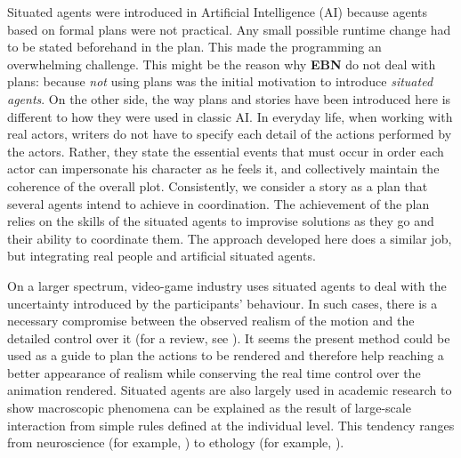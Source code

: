 \documentclass[
		twoside,openright,titlepage,numbers=noenddot,manychapters,
		headinclude,%
                footinclude=false,cleardoublepage=empty,
                BCOR=5mm,
		fontsize=11pt, %
                 enabledeprecatedfontcommands]{scrreprt}
\begin{document}
Situated agents were introduced in Artificial Intelligence (AI) because agents based on formal plans were not practical. Any small possible runtime change had to be stated beforehand in the plan. This made the programming an overwhelming challenge. This might be the reason why \textbf{EBN} do not deal with plans: because \emph{not} using plans was the initial motivation to introduce \emph{situated agents}. On the other side, the way plans and stories have been introduced here is different to how they were used in classic AI. In everyday life, when working with real actors, writers do not have to specify each detail of the actions performed by the actors. Rather, they state the essential events that must occur in order each actor can impersonate his character as he feels it, and collectively maintain the coherence of the overall plot. Consistently, we consider a story as a plan that several agents intend to achieve in coordination. The achievement of the plan relies on the skills of the situated agents to improvise solutions as they go and their ability to coordinate them. The approach developed here does a similar job, but integrating real people and artificial situated agents.

On a larger spectrum, video-game industry uses situated agents to deal with the uncertainty introduced by the participants' behaviour. In such cases, there is a necessary compromise between the observed realism of the motion and the detailed control over it (for a review, see \cite{Welbergen2009}). It seems the present method could be used as a guide to plan the actions to be rendered and therefore help reaching a better appearance of realism while conserving the real time control over the animation rendered.
Situated agents are also largely used in academic research to show macroscopic phenomena can be explained as the result of large-scale interaction from simple rules defined at the individual level. This tendency ranges from neuroscience (for example, \cite{purves2006evolution}) to ethology (for example, \cite{beltran2006sbg}).
\end{document}
